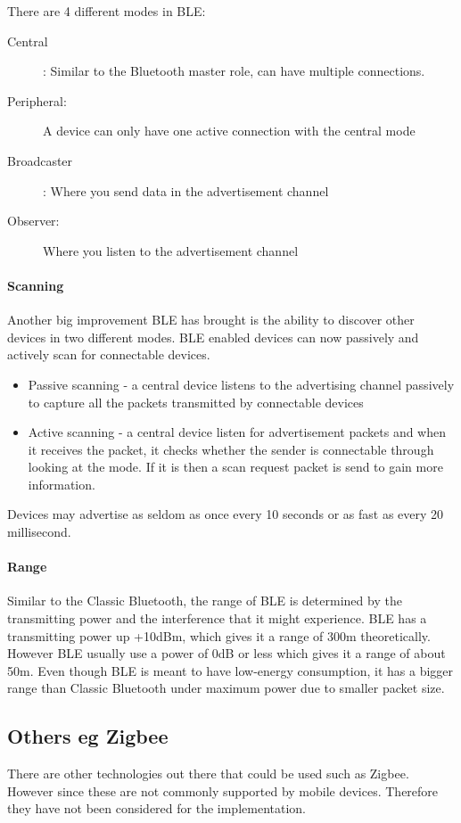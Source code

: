 There are 4 different modes in BLE: 
\begin{description}
\item [{Central}] : Similar to the Bluetooth master role, can have multiple
connections. 
\item [{Peripheral:}] A device can only have one active connection with
the central mode 
\item [{Broadcaster}] : Where you send data in the advertisement channel
\item [{Observer:}] Where you listen to the advertisement channel
\end{description}

\paragraph*{Scanning\protect \linebreak{}
}

Another big improvement BLE has brought is the ability to discover
other devices in two different modes. BLE enabled devices can now
passively and actively scan for connectable devices\cite{bluetooth-chalmers}.
\begin{itemize}
\item Passive scanning - a central device listens to the advertising channel
passively to capture all the packets transmitted by connectable devices 
\item Active scanning - a central device listen for advertisement packets
and when it receives the packet, it checks whether the sender is connectable
through looking at the mode. If it is then a scan request packet is
send to gain more information.
\end{itemize}
Devices may advertise as seldom as once every 10 seconds or as fast
as every 20 millisecond. 


\paragraph*{Range\protect \\
}

Similar to the Classic Bluetooth, the range of BLE is determined by
the transmitting power and the interference that it might experience.
BLE has a transmitting power up +10dBm, which gives it a range of
300m theoretically\cite{bluetooth-chalmers}. However BLE usually use a power of 0dB or less
which gives it a range of about 50m. Even though BLE is meant to have
low-energy consumption, it has a bigger range than Classic Bluetooth
under maximum power due to smaller packet size. 


\subsection{Others eg Zigbee}

There are other technologies out there that could be used such
as Zigbee\cite{zigbee}. However since these are not commonly supported by mobile
devices. Therefore they have not been considered for the implementation.




